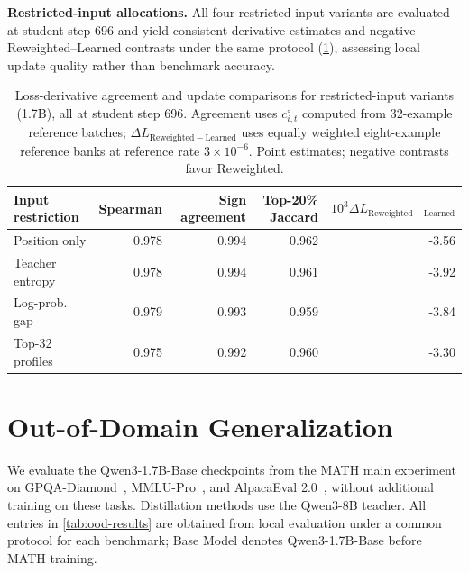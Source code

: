 \documentclass{article}
\theoremstyle{plain}
\theoremstyle{definition}
\theoremstyle{remark}
\begin{document}


\textbf{Restricted-input allocations.}
All four restricted-input variants are evaluated at student step 696 and yield consistent derivative estimates and negative Reweighted--Learned
contrasts under the same protocol (\cref{tab:checkpoint-credit}), assessing local update
quality rather than benchmark accuracy.


\begin{table}[!htb]
\centering
\small
\caption{Loss-derivative agreement and update comparisons for restricted-input variants (1.7B), all at student step 696. Agreement uses \(c^\circ_{i,t}\) computed from 32-example reference batches; \(\Delta L_{\mathrm{Reweighted}-\mathrm{Learned}}\) uses equally weighted eight-example reference banks at reference rate \(3\times10^{-6}\). Point estimates; negative contrasts favor Reweighted.}
\label{tab:checkpoint-credit}
\begin{tabular}{@{}lrrrr@{}}
\toprule
Input restriction & Spearman & Sign agreement & Top-20\% Jaccard & \(10^3\Delta L_{\mathrm{Reweighted}-\mathrm{Learned}}\) \\
\midrule
Position only & 0.978 & 0.994 & 0.962 & -3.56 \\
Teacher entropy & 0.978 & 0.994 & 0.961 & -3.92 \\
Log-prob. gap & 0.979 & 0.993 & 0.959 & -3.84 \\
Top-32 profiles & 0.975 & 0.992 & 0.960 & -3.30 \\
\bottomrule
\end{tabular}
\end{table}



\clearpage
\section{Out-of-Domain Generalization}
\label{app:ood-generalization}

We evaluate the Qwen3-1.7B-Base checkpoints from the MATH main experiment on GPQA-Diamond~\citep{rein2023gpqa}, MMLU-Pro~\citep{wang2024mmlu}, and AlpacaEval 2.0~\citep{dubois2024length}, without additional training on these tasks. Distillation methods use the Qwen3-8B teacher. All entries in \cref{tab:ood-results} are obtained from local evaluation under a common protocol for each benchmark; Base Model denotes Qwen3-1.7B-Base before MATH training.
\end{document}
